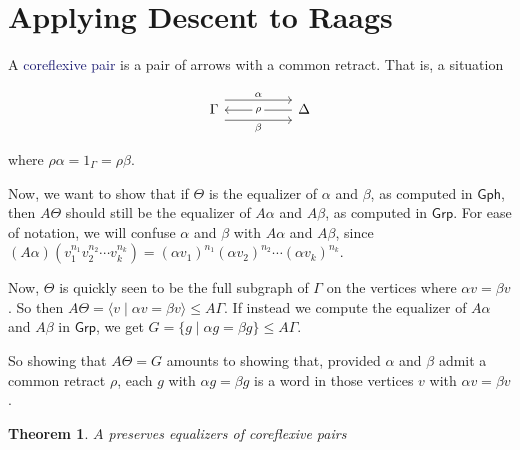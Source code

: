 \documentclass[12pt]{article}
\newtheorem{thm}{Theorem}
\theoremstyle{definition}
\theoremstyle{theorem}
\newcommand*{\catFont}[1]{\mathsf{#1}}
\newcommand{\Grp}{\catFont{Grp}}
\newcommand*{\important}[1]{\textcolor{MidnightBlue}{#1}}
\begin{document}
\section{Applying Descent to Raags}
\label{proof}

A \important{coreflexive pair} is a pair of arrows with a common retract. 
That is, a situation

\[\begin{tikzcd}
	\Gamma && \Delta
	\arrow["\alpha", shift left=3, from=1-1, to=1-3]
	\arrow["\beta"', shift right=3, from=1-1, to=1-3]
	\arrow["\rho"{description}, from=1-3, to=1-1]
\end{tikzcd}\]

where $\rho \alpha = 1_\Gamma = \rho \beta$.

Now, we want to show that if $\Theta$ is the equalizer of $\alpha$ and $\beta$,
as computed in $\mathsf{Gph}$, 
then $A\Theta$ should still be the equalizer of $A \alpha$ and $A \beta$, 
as computed in $\mathsf{Grp}$.
For ease of notation, we will confuse $\alpha$ and $\beta$ with $A \alpha$
and $A \beta$, since 
$(A\alpha)(v_1^{n_1} v_2^{n_2} \cdots v_k^{n_k}) = (\alpha v_1)^{n_1} (\alpha v_2)^{n_2} \cdots (\alpha v_k)^{n_k}$.

Now, $\Theta$ is quickly seen to be the full subgraph of $\Gamma$
on the vertices where $\alpha v = \beta v$. 
So then $A\Theta = \langle v \mid \alpha v = \beta v \rangle \leq A \Gamma$.
If instead we compute the equalizer of $A \alpha$ and $A \beta$ in $\Grp$,
we get $G = \{ g \mid \alpha g = \beta g \} \leq A\Gamma$.

So showing that $A \Theta = G$ amounts to showing that, provided $\alpha$ 
and $\beta$ admit a common retract $\rho$, each $g$ 
with $\alpha g = \beta g$ is a word in those vertices $v$ with $\alpha v = \beta v$.

\begin{thm}
    $A$ preserves equalizers of coreflexive pairs
\end{thm}
\end{document}
